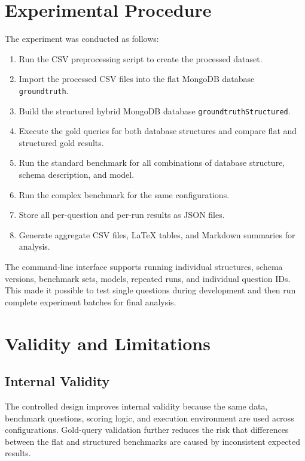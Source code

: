 \section{Experimental Procedure}

The experiment was conducted as follows:

\begin{enumerate}
    \item Run the CSV preprocessing script to create the processed dataset.
    \item Import the processed CSV files into the flat MongoDB database \texttt{groundtruth}.
    \item Build the structured hybrid MongoDB database \texttt{groundtruthStructured}.
    \item Execute the gold queries for both database structures and compare flat and structured gold results.
    \item Run the standard benchmark for all combinations of database structure, schema description, and model.
    \item Run the complex benchmark for the same configurations.
    \item Store all per-question and per-run results as JSON files.
    \item Generate aggregate CSV files, LaTeX tables, and Markdown summaries for analysis.
\end{enumerate}

The command-line interface supports running individual structures, schema versions, benchmark sets, models, repeated runs, and individual question IDs. This made it possible to test single questions during development and then run complete experiment batches for final analysis.

\section{Validity and Limitations}

\subsection{Internal Validity}

The controlled design improves internal validity because the same data, benchmark questions, scoring logic, and execution environment are used across configurations. Gold-query validation further reduces the risk that differences between the flat and structured benchmarks are caused by inconsistent expected results.

